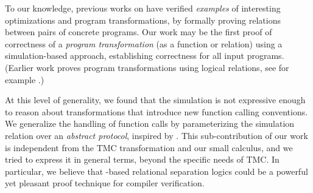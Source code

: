 To our knowledge, previous works on \Simuliris have verified \emph{examples} of interesting optimizations and program transformations, by formally proving relations between pairs of concrete programs. Our work may be the first proof of correctness of a \emph{program transformation} (as a function or relation) using a simulation-based approach, establishing correctness for all input programs. (Earlier \Iris work proves program transformations using logical relations, see for example \citet*{tassarotti-2017}.)

At this level of generality, we found that the \Simuliris simulation is not expressive enough to reason about transformations that introduce new function calling conventions.
%
We generalize the \Simuliris handling of function calls by parameterizing the simulation relation over an \emph{abstract protocol}, inspired by \citet*{protocols-2021}.
%
This sub-contribution of our work is independent from the TMC transformation and our small calculus,
and we tried to express it in general terms, beyond the specific needs of TMC.
%
In particular, we believe that \Iris-based relational separation logics could be a powerful yet pleasant proof technique for compiler verification.

